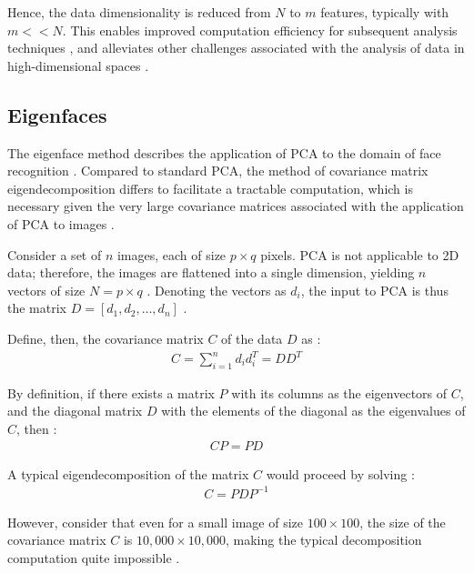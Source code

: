 Hence, the data dimensionality is reduced from $N$ to $m$ features, typically with $m<<N$. This enables improved computation efficiency for subsequent analysis techniques \cite{maaten_2007}, and alleviates other challenges associated with the analysis of data in high-dimensional spaces \cite{bellman_2010}.

\newpage
\subsection{Eigenfaces}

The eigenface method describes the application of PCA to the domain of face recognition \cite{lovell_2008}. Compared to standard PCA, the method of covariance matrix eigendecomposition differs to facilitate a tractable computation, which is necessary given the very large covariance matrices associated with the application of PCA to images \cite{lovell_2008}.

Consider a set of $n$ images, each of size $p\times q$ pixels. PCA is not applicable to 2D data; therefore, the images are flattened into a single dimension, yielding $n$ vectors of size $N=p\times q$ \cite{lovell_2008}. Denoting the vectors as $d_i$, the input to PCA is thus the matrix $D=[d_1, d_2, \ldots, d_n]$ \cite{lovell_2008}.

Define, then, the covariance matrix $C$ of the data $D$ as \cite{lovell_2008}:
\begin{align}
  C = \sum_{i=1}^n d_i d_i^T = DD^T
\end{align}

By definition, if there exists a matrix $P$ with its columns as the eigenvectors of $C$, and the diagonal matrix $D$ with the elements of the diagonal as the eigenvalues of $C$, then \cite{wolfram_2023}:
\begin{align}
  CP = PD
\end{align}

A typical eigendecomposition of the matrix $C$ would proceed by solving \cite{wolfram_2023}:
\begin{align}
  C = PDP^{-1}
\end{align}

However, consider that even for a small image of size $100\times100$, the size of the covariance matrix $C$ is $10,000\times10,000$, making the typical decomposition computation quite impossible \cite{lovell_2008}.

